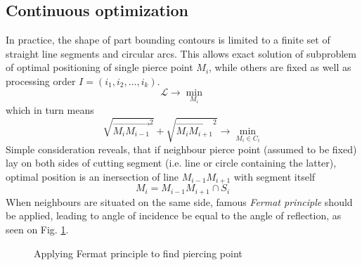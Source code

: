 \documentclass{ifacconf}
\begin{document}
\subsection{Continuous optimization}
In practice,
the shape of part bounding contours
is limited to a finite set
of straight line segments and circular arcs.
This allows exact solution of
subproblem of optimal
positioning of single pierce point $M_i$,
while others are fixed as well as
processing order
$I=(i_1, i_2, \dots, i_k)$.
$$
\mathcal L \to \min_{M_i}
$$
which in turn means
$$
\sqrt{\overrightarrow{M_i M_{i-1}}^2} +
\sqrt{\overrightarrow{M_i M_{i+1}}^2} \to
\min_{M_i \in C_i}
$$
Simple consideration reveals,
that
if neighbour pierce
point (assumed to be fixed)
lay on both sides of cutting segment
(i.e. line or circle containing the latter),
optimal position is an
inersection of line $M_{i-1}M_{i+1}$
with segment itself
$$
M_i = M_{i-1}M_{i+1} \cap S_i
$$
When neighbours are situated
on the same side,
famous \textit{Fermat principle}
should be applied,
leading to
angle of incidence be equal to the angle of reflection,
as seen on Fig. \ref{fermat}.

\begin{figure}
  \begin{center}
  \caption{Applying Fermat principle to find piercing point} \label{fermat}
  \end{center}
\end{figure}
\end{document}
